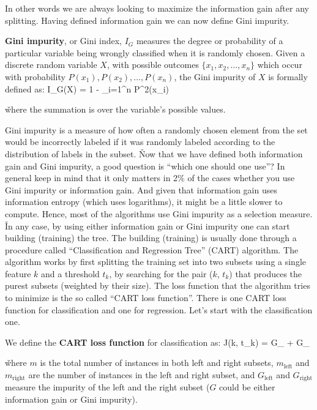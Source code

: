 In other words we are always looking to maximize the information gain after any splitting. Having defined information
gain we can now define Gini impurity.

\textbf{Gini impurity}, or Gini index, $I_{G}$ measures the degree or probability of a particular variable being
wrongly classified when it is randomly chosen. Given a discrete random variable $X$, with possible outcomes $\{x_{1},
x_{2}, \ldots, x_{n} \}$ which occur with probability $ P(x_{1}), P(x_{2}), \ldots, P(x_{n})$, the Gini impurity of
$X$ is formally defined as:
\bse
I_{G}(X) = 1 - \sum _{i=1}^{n} P^2(x_{i})
\ese

\v

where the summation is over the variable's possible values.
\ed

Gini impurity is a measure of how often a randomly chosen element from the set would be incorrectly labeled if it was
randomly labeled according to the distribution of labels in the subset. \v

Now that we have defined both information gain and Gini impurity, a good question is ``which one should one use''? In
general keep in mind that it only matters in 2\% of the cases whether you use Gini impurity or information gain. And
given that information gain uses information entropy (which uses logarithms), it might be a little slower to compute.
Hence, most of the algorithms use Gini impurity as a selection measure. \v

In any case, by using either information gain or Gini impurity one can start building (training) the tree. The
building (training) is usually done through a procedure called ``Classification and Regression Tree'' (CART) algorithm.
The algorithm works by first splitting the training set into two subsets using a single feature $k$ and a threshold
$t_k$, by searching for the pair ($k$, $t_k$) that produces the purest subsets (weighted by their size). The loss
function that the algorithm tries to minimize is the so called ``CART loss function''. There is one CART loss function
for classification and one for regression. Let's start with the classification one.

We define the \textbf{CART loss function} for classification as:
\bse
J(k, t_{k}) =  G_{} +  G_{}
\ese

\v

where $m$ is the total number of instances in both left and right subsets, $m_{\text{left}}$ and
$m_{\text{right}}$ are the number of instances in the left and right subset, and $G_{\text{left}}$ and
$G_{\text{right}}$ measure the impurity of the left and the right subset ($G$ could be either information gain or
Gini impurity).
\ed

